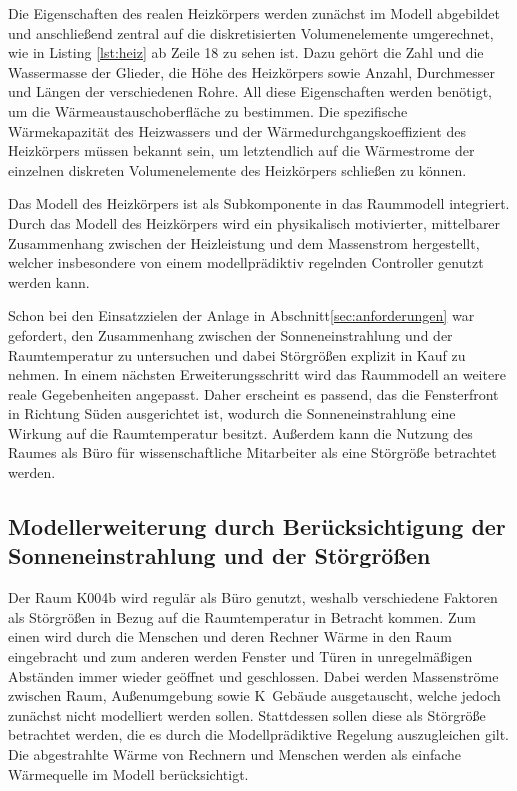 Die Eigenschaften des realen Heizkörpers werden zunächst im Modell abgebildet und anschließend zentral auf die diskretisierten Volumenelemente umgerechnet, wie in Listing \ref{lst:heiz} ab Zeile 18 zu sehen ist. Dazu gehört die Zahl und die Wassermasse der Glieder, die Höhe des Heizkörpers sowie Anzahl, Durchmesser und Längen der verschiedenen Rohre. All diese Eigenschaften werden benötigt, um die Wärmeaustauschoberfläche zu bestimmen. Die spezifische Wärmekapazität des Heizwassers und der Wärmedurchgangskoeffizient des Heizkörpers müssen bekannt sein, um letztendlich auf die Wärmestrome der einzelnen diskreten Volumenelemente des Heizkörpers schließen zu können.



Das Modell des Heizkörpers ist als Subkomponente in das Raummodell integriert. Durch das Modell des Heizkörpers wird ein physikalisch motivierter, mittelbarer Zusammenhang zwischen der Heizleistung und dem Massenstrom hergestellt, welcher insbesondere von einem modellprädiktiv regelnden Controller genutzt werden kann.

Schon bei den Einsatzzielen der Anlage in Abschnitt\ref{sec:anforderungen} war gefordert, den Zusammenhang zwischen der Sonneneinstrahlung und der Raumtemperatur zu untersuchen und dabei Störgrößen explizit in Kauf zu nehmen. In einem nächsten Erweiterungsschritt wird das Raummodell an weitere reale Gegebenheiten angepasst. Daher erscheint es passend, das die Fensterfront in Richtung Süden ausgerichtet ist, wodurch die Sonneneinstrahlung eine Wirkung auf die Raumtemperatur besitzt. Außerdem kann die Nutzung des Raumes als Büro für wissenschaftliche Mitarbeiter als eine Störgröße betrachtet werden.

\subsection{Modellerweiterung durch Berücksichtigung der Sonneneinstrahlung und der Störgrößen}
\label{sub:modsonne}

Der Raum K004b wird regulär als Büro genutzt, weshalb verschiedene Faktoren als Störgrößen in Bezug auf die Raumtemperatur in Betracht kommen. Zum einen wird durch die Menschen und deren Rechner Wärme in den Raum eingebracht und zum anderen werden Fenster und Türen in unregelmäßigen Abständen immer wieder geöffnet und geschlossen. Dabei werden Massenströme zwischen Raum, Außenumgebung sowie K~Gebäude ausgetauscht, welche jedoch zunächst nicht modelliert werden sollen. Stattdessen sollen diese als Störgröße betrachtet werden, die es durch die Modellprädiktive Regelung auszugleichen gilt. Die abgestrahlte Wärme von Rechnern und Menschen werden als einfache Wärmequelle im Modell berücksichtigt. 

